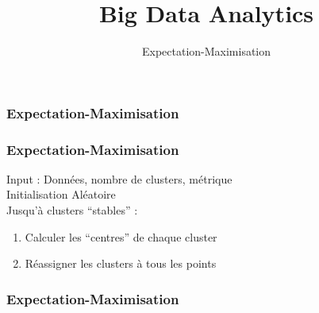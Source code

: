 \documentclass{formation}
\title{Big Data Analytics}
\subtitle{Expectation-Maximisation}
\begin{document}
\maketitle


\begin{frame}
  \frametitle{Expectation-Maximisation}
\end{frame}

\begin{frame}
  \frametitle{Expectation-Maximisation}
  Input : Données, nombre de clusters, métrique \\
  Initialisation Aléatoire \\
  Jusqu'à clusters ``stables'' :\\
  \begin{enumerate}
  \item Calculer les ``centres'' de chaque cluster
  \item Réassigner les clusters à tous les points
  \end{enumerate}
\end{frame}

\begin{frame}
  \frametitle{Expectation-Maximisation}
\end{frame}
\end{document}
